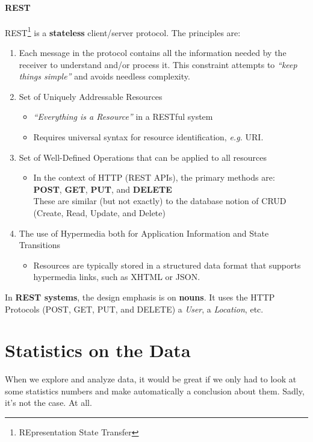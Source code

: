 \documentclass[a4paper,11pt,twoside]{article}
\begin{document}
\paragraph{REST}

REST\footnote{REpresentation State Transfer} is a {\bf stateless} client/server protocol. The principles are:
\begin{enumerate}
 \item Each message in the protocol contains all the information needed by the receiver to understand and/or process it. This constraint attempts to {\it ``keep things simple''} and avoids needless complexity.
 \item Set of Uniquely Addressable Resources
 \begin{itemize}
  \item {\it ``Everything is a Resource''} in a RESTful system
  \item Requires universal syntax for resource identification, {\it e.g.} URI.
 \end{itemize}
 \item Set of Well-Defined Operations that can be applied to all resources
 \begin{itemize}
  \item In the context of HTTP (REST APIs), the primary methods are: \\
  {\bf POST}, {\bf GET}, {\bf PUT}, and {\bf DELETE} \\
  These are similar (but not exactly) to the database notion of CRUD (Create, Read, Update, and Delete)
 \end{itemize}
 \item The use of Hypermedia both for Application Information and State Transitions
 \begin{itemize}
  \item Resources are typically stored in a structured data format that supports hypermedia links, such as XHTML or JSON.
 \end{itemize}
\end{enumerate}
In {\bf REST systems}, the design emphasis is on {\bf nouns}. It uses the HTTP Protocols (POST, GET, PUT, and DELETE) a {\it User}, a {\it Location}, etc. 

\section{Statistics on the Data}

When we explore and analyze data, it would be great if we only had to look at some statistics numbers and make automatically a conclusion about them. Sadly, it's not the case. At all.
\end{document}
